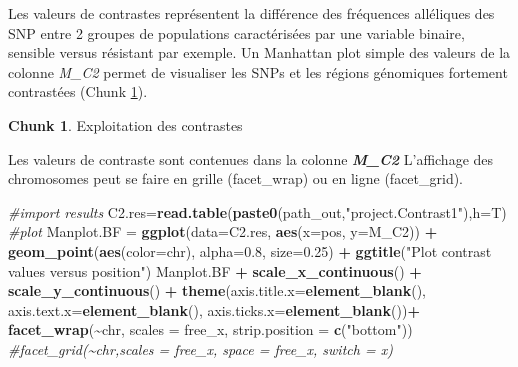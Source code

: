 \documentclass[
  openany]{book}
\newenvironment{Shaded}{\begin{snugshade}}{\end{snugshade}}
\newcommand{\AttributeTok}[1]{\textcolor[rgb]{0.13,0.29,0.53}{#1}}
\newcommand{\CommentTok}[1]{\textcolor[rgb]{0.56,0.35,0.01}{\textit{#1}}}
\newcommand{\FloatTok}[1]{\textcolor[rgb]{0.00,0.00,0.81}{#1}}
\newcommand{\FunctionTok}[1]{\textcolor[rgb]{0.13,0.29,0.53}{\textbf{#1}}}
\newcommand{\NormalTok}[1]{#1}
\newcommand{\OtherTok}[1]{\textcolor[rgb]{0.56,0.35,0.01}{#1}}
\newcommand{\SpecialCharTok}[1]{\textcolor[rgb]{0.81,0.36,0.00}{\textbf{#1}}}
\newcommand{\StringTok}[1]{\textcolor[rgb]{0.31,0.60,0.02}{#1}}
\theoremstyle{definition}
\theoremstyle{definition}
\theoremstyle{definition}
\newtheorem{exercise}{Chunk}[chapter]
\theoremstyle{definition}
\theoremstyle{remark}
\begin{document}
Les valeurs de contrastes représentent la différence des fréquences alléliques des SNP entre 2 groupes de populations caractérisées par une variable binaire, sensible versus résistant par exemple.
Un Manhattan plot simple des valeurs de la colonne \emph{M\_C2} permet de visualiser les SNPs et les régions génomiques fortement contrastées (Chunk \ref{exr:chunk9}).

\begin{exercise}
\protect\hypertarget{exr:chunk9}{}\label{exr:chunk9}{Exploitation des contrastes}
\end{exercise}

Les valeurs de contraste sont contenues dans la colonne \textbf{\emph{M\_C2}}
L'affichage des chromosomes peut se faire en grille (facet\_wrap) ou en ligne (facet\_grid).

\begin{Shaded}
\begin{Highlighting}[]
\CommentTok{\#import results}
\NormalTok{C2.res}\OtherTok{=}\FunctionTok{read.table}\NormalTok{(}\FunctionTok{paste0}\NormalTok{(path\_out,}\StringTok{"project.Contrast1"}\NormalTok{),}\AttributeTok{h=}\NormalTok{T)}
\CommentTok{\#plot}
\NormalTok{Manplot.BF }\OtherTok{=} \FunctionTok{ggplot}\NormalTok{(}\AttributeTok{data=}\NormalTok{C2.res, }\FunctionTok{aes}\NormalTok{(}\AttributeTok{x=}\NormalTok{pos, }\AttributeTok{y=}\NormalTok{M\_C2)) }\SpecialCharTok{+}
  \FunctionTok{geom\_point}\NormalTok{(}\FunctionTok{aes}\NormalTok{(}\AttributeTok{color=}\NormalTok{chr), }\AttributeTok{alpha=}\FloatTok{0.8}\NormalTok{, }\AttributeTok{size=}\FloatTok{0.25}\NormalTok{) }\SpecialCharTok{+}
  \FunctionTok{ggtitle}\NormalTok{(}\StringTok{"Plot contrast values versus position"}\NormalTok{)}
\NormalTok{Manplot.BF }\SpecialCharTok{+} \FunctionTok{scale\_x\_continuous}\NormalTok{() }\SpecialCharTok{+}
  \FunctionTok{scale\_y\_continuous}\NormalTok{() }\SpecialCharTok{+}
  \FunctionTok{theme}\NormalTok{(}\AttributeTok{axis.title.x=}\FunctionTok{element\_blank}\NormalTok{(), }\AttributeTok{axis.text.x=}\FunctionTok{element\_blank}\NormalTok{(), }\AttributeTok{axis.ticks.x=}\FunctionTok{element\_blank}\NormalTok{())}\SpecialCharTok{+}
  \FunctionTok{facet\_wrap}\NormalTok{(}\SpecialCharTok{\textasciitilde{}}\NormalTok{chr, }\AttributeTok{scales =} \StringTok{\textquotesingle{}free\_x\textquotesingle{}}\NormalTok{, }\AttributeTok{strip.position =} \FunctionTok{c}\NormalTok{(}\StringTok{"bottom"}\NormalTok{))}
  \CommentTok{\#facet\_grid(\textasciitilde{}chr,scales = \textquotesingle{}free\_x\textquotesingle{}, space = \textquotesingle{}free\_x\textquotesingle{}, switch = \textquotesingle{}x\textquotesingle{})}
\end{Highlighting}
\end{Shaded}
\end{document}
